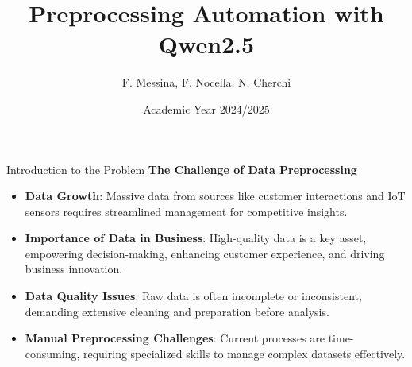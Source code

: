 \documentclass{beamer}
\title{\textcolor{myBlue}{Preprocessing Automation with Qwen2.5}}
\author{F. Messina, F. Nocella, N. Cherchi}
\date{\textcolor{myAccent}{Academic Year 2024/2025}}
\begin{document}
\begin{frame}[plain]
    \titlepage
\end{frame}


\begin{frame}{Introduction to the Problem}
    \textbf{\textcolor{myBlue}{The Challenge of Data Preprocessing}}
    \vspace{0.3cm}
    \begin{itemize}
        \item \textbf{Data Growth}: Massive data from sources like customer interactions and IoT sensors requires streamlined management for competitive insights.
        \item \textbf{\textcolor{myAccent}{Importance of Data in Business}}: High-quality data is a key asset, empowering decision-making, enhancing customer experience, and driving business innovation.
        \item \textbf{{Data Quality Issues}}: Raw data is often incomplete or inconsistent, demanding extensive cleaning and preparation before analysis.
        \item \textbf{\textcolor{myAccent}{Manual Preprocessing Challenges}}: Current processes are time-consuming, requiring specialized skills to manage complex datasets effectively.
    \end{itemize}
\end{frame}
\end{document}
